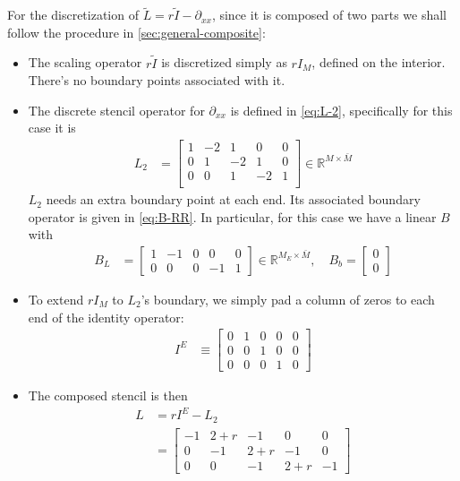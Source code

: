 \documentclass[11pt]{article}
\newcommand{\R}{\ensuremath{\mathbb{R}}}
\newcommand{\D}[1][]{\ensuremath{\partial_{#1}}}
\begin{document}
For the discretization of $\tilde{L} = r\tilde{I} - \D[xx]$, since it is composed of two parts we shall follow the procedure in \ref{sec:general-composite}:
\begin{itemize}
	\item The scaling operator $r\tilde{I}$ is discretized simply as $rI_M$, defined on the interior. There's no boundary points associated with it.

	\item The discrete stencil operator for $\D[xx]$ is defined in \cref{eq:L-2}, specifically for this case it is
	\begin{align}
		L_2 &= \begin{bmatrix}
			1 & -2 & 1 & 0 & 0\\
			0 & 1 & -2 & 1 & 0\\	
			0 & 0 & 1 & -2 & 1\\	
			\end{bmatrix}\in \R^{M \times \bar{M}}
	\end{align}
	$L_2$ needs an extra boundary point at each end. Its associated boundary operator is given in \cref{eq:B-RR}. In particular, for this case we have a linear $B$ with
	\begin{align}
		B_L &= \begin{bmatrix}
				1 & -1 & 0 & 0 & 0\\
				0 & 0 & 0 & -1 & 1
			 \end{bmatrix}\in\R^{M_E \times \bar{M}},\quad
		B_b = \begin{bmatrix}0 \\ 0\end{bmatrix}\label{eq:B-example-A1}
	\end{align}

	\item To extend $rI_M$ to $L_2$'s boundary, we simply pad a column of zeros to each end of the identity operator:
	\begin{align}
		I^E &\equiv \begin{bmatrix}
			0 & 1 & 0 & 0 & 0\\
			0 & 0 & 1 & 0 & 0\\
			0 & 0 & 0 & 1 & 0
		\end{bmatrix}
	\end{align}

	\item The composed stencil is then
	\begin{align}
		L &= rI^E - L_2\\
		  &= \begin{bmatrix}
				-1 & 2 + r & -1 & 0 & 0\\
				0 & -1 & 2+r & -1 & 0\\
				0 & 0 & -1 & 2+r & -1
			  \end{bmatrix}\label{eq:L-example1}
	\end{align}
\end{itemize}
\end{document}
